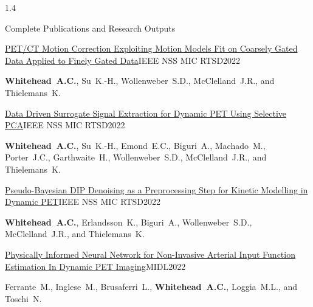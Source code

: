 \documentclass{cv}
\begin{document}
\begin{spacing}{1.4}
\begin{rSection}{Complete Publications and Research Outputs}
            \vspace{-0.5cm}
            \item \begin{rSubsection}{\href{https://doi.org/10.1109/NSS/MIC44845.2022.10399154}{PET/CT Motion Correction Exploiting Motion Models Fit on Coarsely Gated Data Applied to Finely Gated Data}}{}{IEEE NSS MIC RTSD}{2022}
                \vspace{-0.25cm}
                \item \textbf{Whitehead~A.C.}, Su~K.-H., Wollenweber~S.D., McClelland~J.R., and Thielemans~K.
                \\
            \end{rSubsection}
    
            \vspace{-0.5cm}
            \item \begin{rSubsection}{\href{https://doi.org/10.1109/NSS/MIC44845.2022.10399196}{Data Driven Surrogate Signal Extraction for Dynamic PET Using Selective PCA}}{}{IEEE NSS MIC RTSD}{2022}
                \vspace{-0.25cm}
                \item \textbf{Whitehead~A.C.}, Su~K.-H., Emond~E.C., Biguri~A., Machado~M., Porter~J.C., Garthwaite~H., Wollenweber~S.D., McClelland~J.R., and Thielemans~K.
                \\
            \end{rSubsection}
    
            \vspace{-0.5cm}
            \item \begin{rSubsection}{\href{https://doi.org/10.1109/NSS/MIC44845.2022.10399318}{Pseudo-Bayesian DIP Denoising as a Preprocessing Step for Kinetic Modelling in Dynamic PET}}{}{IEEE NSS MIC RTSD}{2022}
                \vspace{-0.25cm}
                \item \textbf{Whitehead~A.C.}, Erlandsson~K., Biguri~A., Wollenweber~S.D., McClelland~J.R., and Thielemans~K.
                \\
            \end{rSubsection}
    
            \vspace{-0.5cm}
            \item \begin{rSubsection}{\href{https://2022.midl.io/papers/e_s_5}{Physically Informed Neural Network for Non-Invasive Arterial Input Function Estimation In Dynamic PET Imaging}}{}{MIDL}{2022}
                \vspace{-0.25cm}
                \item Ferrante~M., Inglese~M., Brusaferri~L., \textbf{Whitehead~A.C.}, Loggia~M.L., and Toschi~N.
                \\
            \end{rSubsection}


\end{rSection}
\end{spacing}
\end{document}
